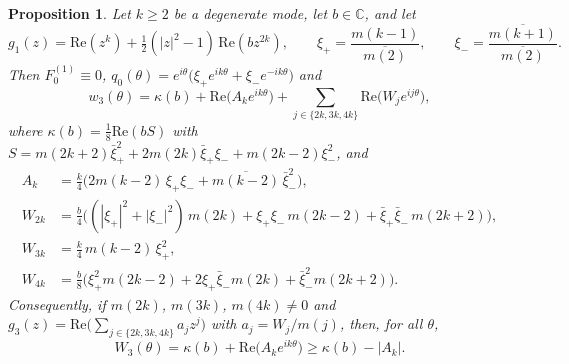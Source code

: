 \documentclass[a4paper,11pt,twoside,leqno]{article}
\newtheorem{prop}[teo]{Proposition}
\numberwithin{equation}{section}
\begin{document}
\begin{prop}\label{prop-closed}
Let $k \geq 2$ be a degenerate mode, let $b \in \mathbb{C}$, and let
\[
g_1(z) = \mathrm{Re}(z^k) + \tfrac{1}{2}(|z|^2 - 1)\, \mathrm{Re}(b z^{2k}),
\qquad
\xi_+ = \frac{m(k-1)}{\overline{m(2)}},
\qquad
\xi_- = \frac{\overline{m(k+1)}}{\overline{m(2)}}.
\]
Then $F_0^{(1)} \equiv 0$, $q_0(\theta) = e^{i\theta}\big(\xi_+ e^{ik\theta} + \xi_- e^{-ik\theta}\big)$ and
\[
w_3(\theta) = \kappa(b) + \mathrm{Re}\big(A_k e^{ik\theta}\big) + \sum_{j \in \{2k, 3k, 4k\}} \mathrm{Re}\big(W_j e^{ij\theta}\big),
\]
where $\kappa(b) = \frac{1}{8}\mathrm{Re}(b S)$ with $S = m(2k+2)\bar\xi_+^2 + 2 m(2k)\bar\xi_+ \xi_- + m(2k-2) \xi_-^2$, and
\begin{align*}
A_k &= \tfrac{k}{4}\big( 2 m(k-2)\, \xi_+ \xi_- + \overline{m(k-2)}\, \bar\xi_-^2 \big),
\\
W_{2k} &= \tfrac{b}{4}\big( (|\xi_+|^2 + |\xi_-|^2)\, m(2k) + \xi_+ \xi_-\, m(2k-2) + \bar\xi_+ \bar\xi_-\, m(2k+2) \big),
\\
W_{3k} &= \tfrac{k}{4}\, m(k-2)\, \xi_+^2,
\\
W_{4k} &= \tfrac{b}{8}\big( \xi_+^2 m(2k-2) + 2 \xi_+ \bar\xi_- m(2k) + \bar\xi_-^2 m(2k+2) \big).
\end{align*}
Consequently, if $m(2k)$, $m(3k)$, $m(4k) \neq 0$ and $g_3(z) = \mathrm{Re}\big( \sum_{j \in \{2k,3k,4k\}} a_j z^j \big)$ with $a_j = W_j / m(j)$, then, for all $\theta$,
\[
W_3(\theta) = \kappa(b) + \mathrm{Re}\big(A_k e^{ik\theta}\big) \geq \kappa(b) - |A_k|.
\]
\end{prop}
\end{document}

